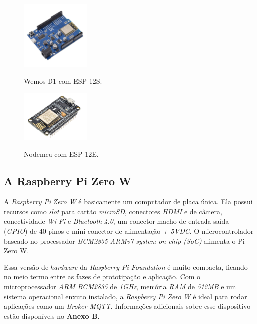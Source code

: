 \begin{figure}[H]
	\centering
	\caption{Wemos D1 com ESP-12S.}
	\includegraphics[width=0.3\textwidth]{figuras/ESP-12S-wemos.png}
	\label{fig:esp12s-wemos}
\end{figure}

\begin{figure}[H]
	\centering
	\caption{Nodemcu com ESP-12E.}
	\includegraphics[width=0.3\textwidth]{figuras/ESP-12E-nodemcu.png}
	\label{fig:esp12s-nodemcu}
\end{figure}







\subsection{A Raspberry Pi Zero W}

A \textit{Raspberry Pi Zero W} é basicamente um computador de placa única. Ela possui recursos como \textit{slot} para cartão \textit{microSD}, conectores \textit{HDMI} e de câmera, conectividade \textit{Wi-Fi} e \textit{Bluetooth 4.0}, um conector macho de entrada-saída (\textit{GPIO}) de 40 pinos e mini conector de alimentação \textit{+ 5VDC}. O microcontrolador baseado no processador \textit{BCM2835 ARMv7 system-on-chip (SoC)} alimenta o Pi Zero W.

Essa versão de \textit{hardware} da \textit{Raspberry Pi Foundation} é muito compacta, ficando no meio termo entre as fazes de prototipação e aplicação. Com o microprocessador \textit{ARM BCM2835} de \textit{1GHz}, memória \textit{RAM} de \textit{512MB} e um sistema operacional enxuto instalado, a \textit{Raspberry Pi Zero W} é ideal para rodar aplicações como um \textit{Broker MQTT}. Informações adicionais sobre esse dispositivo estão disponíveis no \textbf{Anexo B}.


